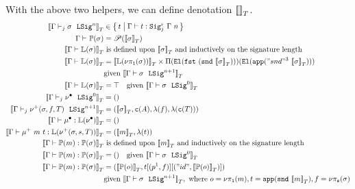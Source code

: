 With the above two helpers, we can define denotation ${{\llbracket {} \rrbracket}_T}$.
%
\begin{align*}
  \denotesT{\goodSigU{j}{\Gamma}{\lsig}{n}} &\in \setc{t}{ \goodTerm{\Gm}{t}{\Sigr{\Gm}{n}{j}} } \\
  {\goodType{\Gamma}{\TyTkg{\lsig}}{}} &= \mathscr{P}(\denotesT{\lsig}) \\
  \denotesT{\goodType{\Gamma}{\TyLkg{\sigma}}{}} &\text{ is defined upon } \denotesT{\lsig}
  \text{ and inductively on the signature length} \\
  \denotesT{\goodType{\Gamma}{\TyLkg{\sigma}}{}} &=
  \denotesT{\TyLkg{\lsigproj{1}{\sigma}}} \times \Pi(\El{\fst{(\snd{\denotesT{\sigma}})}})(\El{\app{"snd"^3~\denotesT{\sigma}}}) \\
  &\text{given } \denotesT{\goodSig{\Gamma}{\sigma}{n+1}} \\
  \denotesT{\goodType{\Gamma}{\TyLkg{\sigma}}{}} &= \top \quad
  \text{given } \denotesT{\goodSig{\Gamma}{\sigma}{0}} \\
  \denotesT{\goodSigU{j}{\Gamma}{\LSigEmp}{0}} &= \unit \\
  \denotesT{\goodSigU{j}{\Gamma}{\LSigAdd{\sigma}{f}{T}}{n+1}} &= (\denotesT{\sigma}, \codety{A}, \lam{f}, \lam{\codety{T}}) \\
  \denotesT{\goodTerm{\Gamma}{\LkgEmp}{\TyLkg{\LSigEmp}}} &= \unit \\
  \denotesT{\goodTerm{\Gamma}{\mu^+~m~t}{\TyLkg{\LSigAdd{\sigma}{s}{T}}}} &= (\denotesT{m}, \lam{t}) \\
  \denotesT{\goodTerm{\Gamma}{\Tkg{m}}{\TyTkg {\sigma}}} & \text{ is defined upon } \denotesT{m} \text{ and inductively on the signature length} \\
  \denotesT{\goodTerm{\Gamma}{\Tkg {m}}{\TyTkg {\sigma}}} &= () \quad \text{given } \denotesT{\goodSig{\Gamma}{\sigma}{0}} \\
  \denotesT{\goodTerm{\Gamma}{\Tkg {m}}{\TyTkg {\sigma}}} &= 
  (\denotesT{\Tkg {o}}, t[(\SubstExt{p^1}{f})][(\SubstExt{"id"}{\denotesT{\Tkg {o}}})]) \\
  & \text{given } \denotesT{\goodSig{\Gamma}{\sigma}{n+1}}, \text{ where } o = \lsigproj{1}{m}, t = \app{\snd{\denotesT{m}}}, f = \lsigproj{s}{\lsig}
\end{align*}



